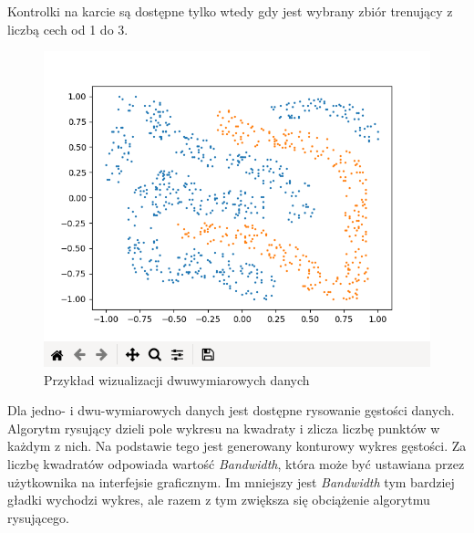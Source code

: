 \documentclass[paper=a4, fontsize=11pt]{scrartcl} %
\numberwithin{equation}{section} %
\numberwithin{figure}{section} %
\begin{document}
    \par Kontrolki na karcie są dostępne tylko wtedy gdy jest wybrany zbiór trenujący z liczbą
    cech od 1 do 3. 

    \begin{figure}[H]
        \begin{center}
            \includegraphics[scale=0.65]{./img/2dplot_ex1.png}
            \caption{Przykład wizualizacji dwuwymiarowych danych}
            \label{fig:visualization}
        \end{center}
    \end{figure}

    \par Dla jedno- i dwu-wymiarowych danych jest dostępne rysowanie gęstości danych. Algorytm
    rysujący dzieli pole wykresu na kwadraty i zlicza liczbę punktów w każdym z nich. Na
    podstawie tego jest generowany konturowy wykres gęstości. Za liczbę kwadratów odpowiada
    wartość \textit{Bandwidth}, która może być ustawiana przez użytkownika na interfejsie
    graficznym. Im mniejszy jest \textit{Bandwidth} tym bardziej gładki wychodzi wykres, ale
    razem z tym zwiększa się obciążenie algorytmu rysującego. 
\end{document}
